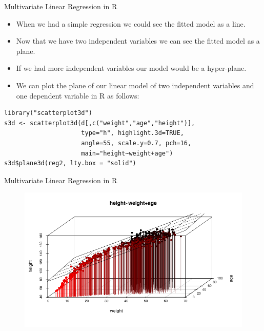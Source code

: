 \documentclass[handout]{beamer}
\begin{document}
\begin{frame}[fragile]{Multivariate Linear Regression in R}
\scriptsize{
\begin{itemize}
 \item When we had a simple regression we could see the fitted model as a line.
 \item Now that we have two independent variables we can see the fitted model as a plane.
 \item If we had more independent variables our model would be a hyper-plane.
 \item We can plot the plane of our linear model of two independent variables and one dependent variable in R as follows:
 \end{itemize}

\begin{verbatim}
library("scatterplot3d")
s3d <- scatterplot3d(d[,c("weight","age","height")],
                     type="h", highlight.3d=TRUE,
                     angle=55, scale.y=0.7, pch=16, 
                     main="height~weight+age")
s3d$plane3d(reg2, lty.box = "solid")
\end{verbatim}




} 
\end{frame}

\begin{frame}{Multivariate Linear Regression in R}
 
\begin{figure}[h!]
	\centering
	\includegraphics[scale=0.55]{pics/reg3d.png}
\end{figure}
 
\end{frame}
\end{document}
